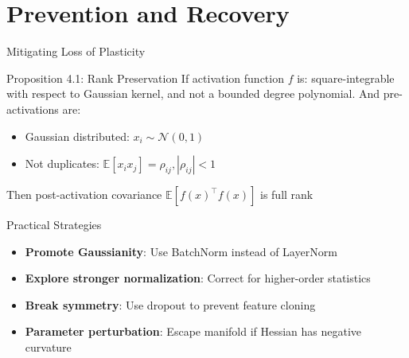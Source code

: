 \documentclass{beamer}
\newcommand{\E}{\mathbb{E}}
\begin{document}
\begin{frame}{}
\end{frame}

\section{Prevention and Recovery}
\begin{frame}{}
\end{frame}

\begin{frame}{Mitigating Loss of Plasticity}
    \begin{block}{Proposition 4.1: Rank Preservation}
        If activation function $f$ is: square-integrable with respect to Gaussian kernel, and not a bounded degree polynomial. And pre-activations are:
        \begin{itemize}
            \item Gaussian distributed: $x_i \sim \mathcal{N}(0,1)$
            \item Not duplicates: $\E[x_i x_j] = \rho_{ij}, |\rho_{ij}| < 1$
        \end{itemize}
        
        Then post-activation covariance $\E[f(x)^\top f(x)]$ is full rank
    \end{block}
    
    \begin{alertblock}{Practical Strategies}
        \begin{itemize}
            \item \textbf{Promote Gaussianity}: Use BatchNorm instead of LayerNorm
            \item \textbf{Explore stronger normalization}: Correct for higher-order statistics
            \item \textbf{Break symmetry}: Use dropout to prevent feature cloning
            \item \textbf{Parameter perturbation}: Escape manifold if Hessian has negative curvature
        \end{itemize}
    \end{alertblock}
\end{frame}
\end{document}
